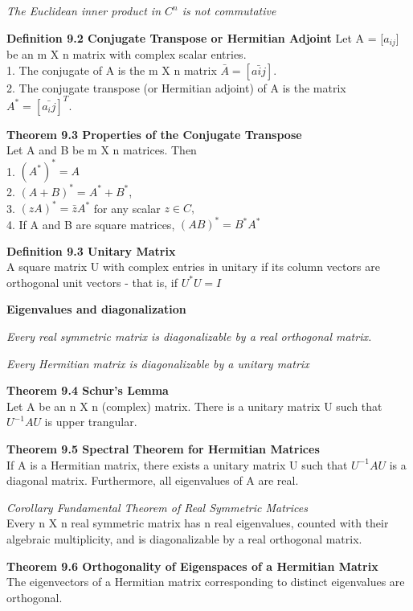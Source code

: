 \documentclass {article}
\begin{document}
\textit {The Euclidean inner product in $C^n$ is not commutative}

\textbf {Definition 9.2 Conjugate Transpose or Hermitian Adjoint} Let A = [$a_{ij}$] be an m X n matrix with complex scalar entries. \\

1. The conjugate of A is the m X n matrix $\bar{A} = [\bar{a{ij}}]$. \\

2. The conjugate transpose (or Hermitian adjoint) of A is the matrix $A^* = [\bar{a_ij}]^T$. 

\textbf {Theorem 9.3 Properties of the Conjugate Transpose} \\
Let A and B be m X n matrices. Then \\
1. $(A^*)^* = A$ \\
2. $(A + B)^* = A^* + B^*$, \\
3. $(zA)^* = \bar{z}A^*$ for any scalar $ z \in C, $ \\
4. If A and B are square matrices, $(AB)^* = B^*A^*$

\textbf {Definition 9.3 Unitary Matrix} \\
A square matrix U with complex entries in unitary if its column vectors are orthogonal unit vectors - that is, if $U^*U=I$

\textbf {Eigenvalues and diagonalization}

\textit {Every real symmetric matrix is diagonalizable by a real orthogonal matrix.}

\textit {Every Hermitian matrix is diagonalizable by a unitary matrix }

\textbf {Theorem 9.4 Schur's Lemma} \\
Let A be an n X n (complex) matrix. There is a unitary matrix U such that $U^{-1}AU$ is upper trangular.

\textbf {Theorem 9.5 Spectral Theorem for Hermitian Matrices} \\
If A is a Hermitian matrix, there exists a unitary matrix U such that $U^{-1}AU$ is a diagonal matrix. Furthermore, all eigenvalues of A are real.

\textit {Corollary Fundamental Theorem of Real Symmetric Matrices} \\
Every n X n real symmetric matrix has n real eigenvalues, counted with their algebraic multiplicity, and is diagonalizable by a real orthogonal matrix.

\textbf {Theorem 9.6 Orthogonality of Eigenspaces of a Hermitian Matrix} \\
The eigenvectors of a Hermitian matrix corresponding to distinct eigenvalues are orthogonal.
\end{document}
